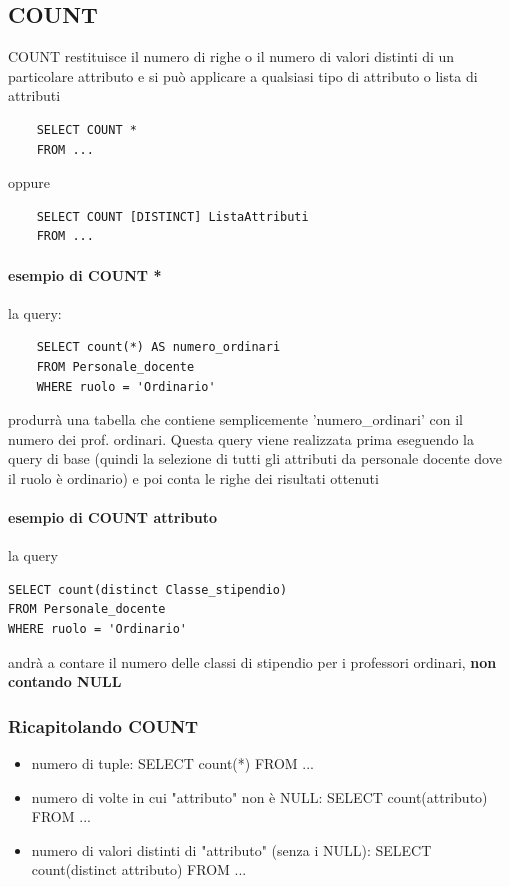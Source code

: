 \documentclass[12pt, a4paper, openany]{book}
\begin{document}
\subsection{COUNT}
COUNT restituisce il numero di righe o il numero di valori distinti di un particolare attributo e si può applicare a qualsiasi tipo di attributo o lista di attributi
\begin{verbatim}
    SELECT COUNT *
    FROM ...
\end{verbatim}
oppure
\begin{verbatim}
    SELECT COUNT [DISTINCT] ListaAttributi
    FROM ...
\end{verbatim}

\paragraph{esempio di COUNT *}
la query:
\begin{verbatim}
    SELECT count(*) AS numero_ordinari
    FROM Personale_docente
    WHERE ruolo = 'Ordinario'
\end{verbatim}
produrrà una tabella che contiene semplicemente 'numero\_ordinari' con il numero dei prof. ordinari. Questa query viene realizzata prima eseguendo la query di base (quindi la selezione di tutti gli attributi da personale docente dove il ruolo è ordinario) e poi conta le righe dei risultati ottenuti
\paragraph{esempio di COUNT attributo}
la query
\begin{verbatim}
SELECT count(distinct Classe_stipendio)
FROM Personale_docente
WHERE ruolo = 'Ordinario'
\end{verbatim}
andrà a contare il numero delle classi di stipendio per i professori ordinari, \textbf{non contando NULL}

\subsubsection{Ricapitolando COUNT}
\begin{itemize}
    \item numero di tuple: SELECT count(*) FROM ...
    \item numero di volte in cui "attributo" non è NULL: SELECT count(attributo) FROM ...
    \item numero di valori distinti di "attributo" (senza i NULL): SELECT count(distinct attributo) FROM ...
\end{itemize}
\end{document}
